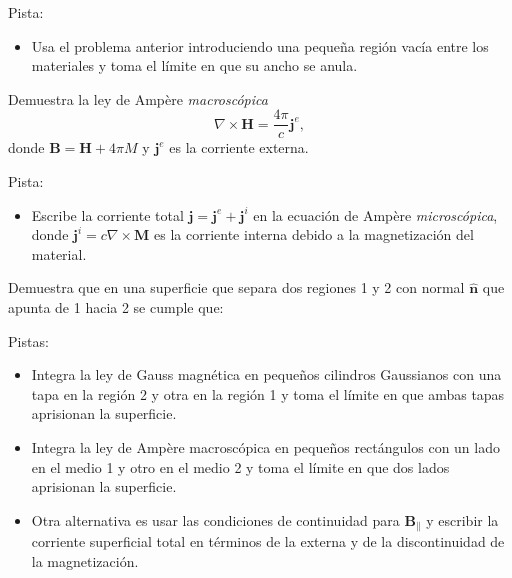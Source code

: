 \documentclass{exam}
\begin{document}
\begin{questions}
  Pista:
  \begin{itemize}
  \item Usa el problema anterior introduciendo una pequeña región
    vacía entre los materiales y toma el límite en que su ancho se anula.
  \end{itemize}


\question Demuestra la ley de Ampère {\em macroscópica}
  $$
  \nabla\times\bm H=\frac{4\pi}{c}\bm j^e,
  $$
  donde $\bm B=\bm H+4\pi M$ y $\bm j^e$ es la corriente externa.

  Pista:
  \begin{itemize}
  \item Escribe la corriente total $\bm j=\bm j^e+\bm j^i$ en la ecuación
    de Ampère {\em microscópica}, donde $\bm j^i=c\nabla\times \bm M$ es la corriente
    interna debido a la magnetización del material.
  \end{itemize}


\question Demuestra que en una superficie que separa dos regiones 1 y
  2 con normal $\hat{\bm n}$ que apunta de 1 hacia 2 se cumple que:

  Pistas:
  \begin{itemize}
  \item Integra la ley de Gauss magnética en pequeños cilindros
    Gaussianos con una tapa en la región 2 y otra en la región 1 y toma el
    límite en que ambas tapas aprisionan la superficie.
  \item Integra la ley de Ampère macroscópica en pequeños rectángulos
    con un lado en el medio 1 y otro en el medio 2 y toma el límite en
    que dos lados aprisionan la superficie.
  \item Otra alternativa es usar las condiciones de continuidad para
    $\bm B_\parallel$ y escribir la corriente superficial total en
    términos de la externa y de la discontinuidad de la magnetización.
  \end{itemize}


\end{questions}
\end{document}
